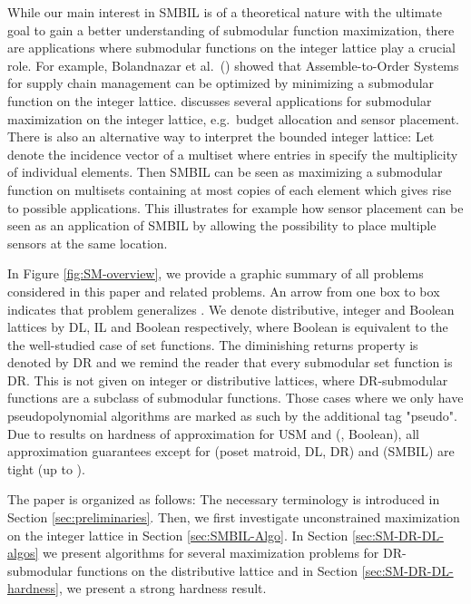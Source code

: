 \documentclass{article}
\theoremstyle{plain}
\theoremstyle{definition}
\begin{document}
While our main interest in SMBIL is of a theoretical nature with the ultimate goal to gain a better understanding of submodular 
function maximization, there are applications where submodular functions on the integer lattice play a crucial role.
For example, Bolandnazar et al.\ (\cite{SubmodSupplyChains}) showed that Assemble-to-Order Systems for supply chain management
can be optimized by  minimizing a submodular function on the integer lattice. 
\cite{Inaba:KnapsackIL} discusses several applications for submodular maximization on the integer lattice, e.g.\ budget allocation and sensor placement. 
There is also an alternative way to interpret the bounded integer lattice: Let  denote the incidence vector of a multiset
where entries in  specify the multiplicity of individual elements. Then SMBIL can be seen as maximizing a submodular function
on multisets containing at most  copies of each element which gives rise to possible applications. This illustrates for example how sensor placement can be 
seen as an application of SMBIL by allowing the possibility to place multiple sensors at the same location. 

In Figure \ref{fig:SM-overview}, we provide a graphic summary of all problems considered in this paper and related problems.  
An arrow from one box  to box  indicates that problem   generalizes . 
We denote distributive, integer and Boolean lattices by DL, IL and Boolean respectively, where Boolean is equivalent to the the well-studied case of set functions. 
The diminishing returns property is denoted by DR and we remind the reader that every submodular set function is  DR. 
This is not given on integer or distributive lattices, 
where DR-submodular functions are a subclass of submodular functions. 
Those cases where we only have pseudopolynomial algorithms are marked as such by the additional tag "pseudo". 
Due to results on hardness of approximation for USM and (, Boolean), all approximation guarantees except for (poset matroid, DL, DR) and (SMBIL) are tight (up to ).


The paper is organized as follows: The necessary terminology is introduced in Section \ref{sec:preliminaries}. Then, we first investigate unconstrained maximization
on the integer lattice in Section \ref{sec:SMBIL-Algo}. In Section \ref{sec:SM-DR-DL-algos} we present algorithms for several 
maximization problems for DR-submodular functions on the distributive lattice and in Section \ref{sec:SM-DR-DL-hardness}, we present a
strong hardness result. 
\end{document}
